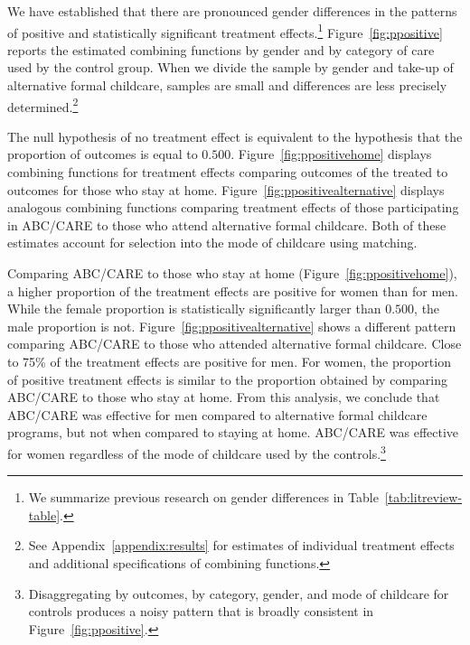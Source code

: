 We have established that there are pronounced gender differences in the patterns of positive and statistically significant treatment effects.\footnote{We summarize previous research on gender differences in Table~\ref{tab:litreview-table}.} Figure~\ref{fig:ppositive} reports the estimated combining functions by gender and by category of care used by the control group. When we divide the sample by gender and take-up of alternative formal childcare, samples are small and differences are less precisely determined.\footnote{See Appendix~\ref{appendix:results} for estimates of individual treatment effects and additional specifications of combining functions.}

The null hypothesis  of no treatment effect is equivalent to the hypothesis that the proportion of outcomes is equal to $0.500$. Figure~\ref{fig:ppositivehome} displays combining functions for treatment effects comparing outcomes of the treated to outcomes for those who stay at home. Figure~\ref{fig:ppositivealternative} displays analogous combining functions comparing treatment effects of those participating in ABC/CARE to those who attend alternative formal childcare. Both of these estimates account for selection into the mode of childcare using matching.

Comparing ABC/CARE to those who stay at home (Figure~\ref{fig:ppositivehome}), a higher proportion of the treatment effects are positive for women than for men. While the female proportion is statistically significantly larger than $0.500$, the male proportion is not. Figure~\ref{fig:ppositivealternative} shows a different pattern comparing ABC/CARE to those who attended alternative formal childcare. Close to 75\% of the treatment effects are positive for men. For women, the proportion of positive treatment effects is similar to the proportion obtained by comparing ABC/CARE to those who stay at home. From this analysis, we conclude that ABC/CARE was effective for men compared to alternative formal childcare programs, but not when compared to staying at home. ABC/CARE was effective for women regardless of the mode of childcare used by the controls.\footnote{Disaggregating by outcomes, by category, gender, and mode of childcare for controls produces a noisy pattern that is broadly consistent in Figure~\ref{fig:ppositive}.}

